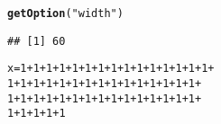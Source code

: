 \documentclass{article}\usepackage[]{graphicx}\usepackage[]{color}
\makeatletter
\newcommand{\hlnum}[1]{\textcolor[rgb]{0.686,0.059,0.569}{#1}}%
\newcommand{\hlstr}[1]{\textcolor[rgb]{0.192,0.494,0.8}{#1}}%
\newcommand{\hlopt}[1]{\textcolor[rgb]{0,0,0}{#1}}%
\newcommand{\hlstd}[1]{\textcolor[rgb]{0.345,0.345,0.345}{#1}}%
\newcommand{\hlkwb}[1]{\textcolor[rgb]{0.69,0.353,0.396}{#1}}%
\newcommand{\hlkwd}[1]{\textcolor[rgb]{0.737,0.353,0.396}{\textbf{#1}}}%
\newenvironment{kframe}{%
 \def\at@end@of@kframe{}%
 \ifinner\ifhmode%
  \def\at@end@of@kframe{\end{minipage}}%
  \begin{minipage}{\columnwidth}%
 \fi\fi%
 \def\FrameCommand##1{\hskip\@totalleftmargin \hskip-\fboxsep
 \colorbox{shadecolor}{##1}\hskip-\fboxsep
     \hskip-\linewidth \hskip-\@totalleftmargin \hskip\columnwidth}%
 \MakeFramed {\advance\hsize-\width
   \@totalleftmargin\z@ \linewidth\hsize
   \@setminipage}}%
 {\par\unskip\endMakeFramed%
 \at@end@of@kframe}
\newenvironment{knitrout}{}{} %
\makeatother
\begin{document}
\begin{knitrout}
\color{fgcolor}\begin{kframe}
\begin{alltt}
\hlkwd{getOption}\hlstd{(}\hlstr{"width"}\hlstd{)}
\end{alltt}
\begin{verbatim}
## [1] 60
\end{verbatim}
\begin{alltt}
\hlstd{x} \hlkwb{=} \hlnum{1} \hlopt{+} \hlnum{1} \hlopt{+} \hlnum{1} \hlopt{+} \hlnum{1} \hlopt{+} \hlnum{1} \hlopt{+} \hlnum{1} \hlopt{+} \hlnum{1} \hlopt{+} \hlnum{1} \hlopt{+} \hlnum{1} \hlopt{+} \hlnum{1} \hlopt{+} \hlnum{1} \hlopt{+} \hlnum{1} \hlopt{+} \hlnum{1} \hlopt{+} \hlnum{1} \hlopt{+} \hlnum{1} \hlopt{+}
    \hlnum{1} \hlopt{+} \hlnum{1} \hlopt{+} \hlnum{1} \hlopt{+} \hlnum{1} \hlopt{+} \hlnum{1} \hlopt{+} \hlnum{1} \hlopt{+} \hlnum{1} \hlopt{+} \hlnum{1} \hlopt{+} \hlnum{1} \hlopt{+} \hlnum{1} \hlopt{+} \hlnum{1} \hlopt{+} \hlnum{1} \hlopt{+} \hlnum{1} \hlopt{+} \hlnum{1} \hlopt{+} \hlnum{1} \hlopt{+}
    \hlnum{1} \hlopt{+} \hlnum{1} \hlopt{+} \hlnum{1} \hlopt{+} \hlnum{1} \hlopt{+} \hlnum{1} \hlopt{+} \hlnum{1} \hlopt{+} \hlnum{1} \hlopt{+} \hlnum{1} \hlopt{+} \hlnum{1} \hlopt{+} \hlnum{1} \hlopt{+} \hlnum{1} \hlopt{+} \hlnum{1} \hlopt{+} \hlnum{1} \hlopt{+} \hlnum{1} \hlopt{+} \hlnum{1} \hlopt{+}
    \hlnum{1} \hlopt{+} \hlnum{1} \hlopt{+} \hlnum{1} \hlopt{+} \hlnum{1} \hlopt{+} \hlnum{1}
\end{alltt}
\end{kframe}
\end{knitrout}
\end{document}
